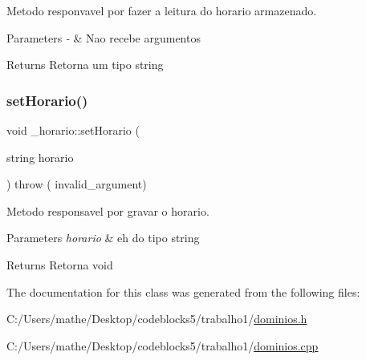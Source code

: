 Metodo responvavel por fazer a leitura do horario armazenado. 


\begin{DoxyParams}{Parameters}
{\em -\/} & Nao recebe argumentos \\
\hline
\end{DoxyParams}
\begin{DoxyReturn}{Returns}
Retorna um tipo string 
\end{DoxyReturn}
\mbox{\label{class__horario_a4dc32be682df655ec6ed2c523488f0e4}} 
\subsubsection{\texorpdfstring{setHorario()}{setHorario()}}
{\footnotesize\ttfamily void \+\_\+horario\+::set\+Horario (\begin{DoxyParamCaption}\item[{string}]{horario }\end{DoxyParamCaption}) throw ( invalid\+\_\+argument) }



Metodo responsavel por gravar o horario. 


\begin{DoxyParams}{Parameters}
{\em horario} & eh do tipo string \\
\hline
\end{DoxyParams}
\begin{DoxyReturn}{Returns}
Retorna void 
\end{DoxyReturn}


The documentation for this class was generated from the following files\+:\begin{DoxyCompactItemize}
\item 
C\+:/\+Users/mathe/\+Desktop/codeblocks5/trabalho1/\mbox{\hyperlink{dominios_8h}{dominios.\+h}}\item 
C\+:/\+Users/mathe/\+Desktop/codeblocks5/trabalho1/\mbox{\hyperlink{dominios_8cpp}{dominios.\+cpp}}\end{DoxyCompactItemize}
